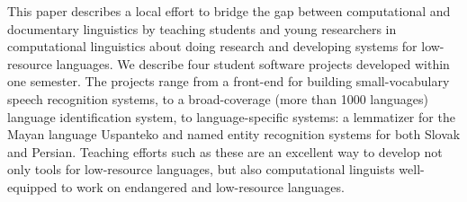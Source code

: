 This paper describes a local effort to bridge the gap between computational and documentary linguistics by teaching students and young researchers in computational linguistics about doing research and developing systems for low-resource languages. We describe four student software projects developed within one semester. The projects range from a front-end for building small-vocabulary speech recognition systems, to a broad-coverage (more than 1000 languages) language identification system, to language-specific systems: a lemmatizer for the Mayan language Uspanteko and named entity recognition systems for both Slovak and Persian. Teaching efforts such as these are an excellent way to develop not only tools for low-resource languages, but also computational linguists well-equipped to work on endangered and low-resource languages.
